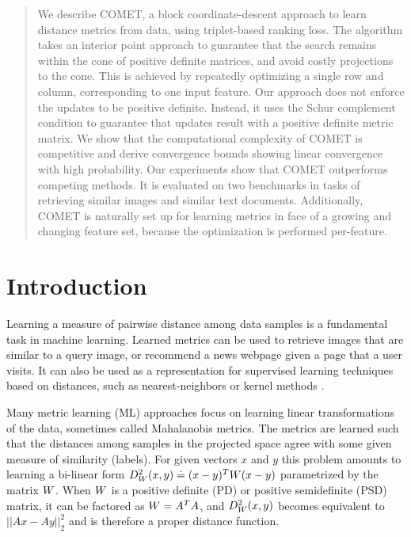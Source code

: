 \documentclass{article}
\begin{document}
\newtheorem{theorem}{Theorem}
\newtheorem{lemma}{Lemma}
\newtheorem{corollary}{Corollary}
\newtheorem{definition}{Definition}
\newtheorem{apptheorem}{Theorem}
\newtheorem{applemma}{Lemma}


\renewcommand{\eqref}[1]{Eq.~(\ref{#1})}
\newcommand{\figref}[1]{Fig.~\ref{#1}}
\newcommand{\secref}[1]{Sec.~\ref{#1}}
\newcommand{\tabref}[1]{Table~\ref{#1}}


\begin{abstract} 
We describe COMET, a block coordinate-descent approach to learn distance metrics from data, using triplet-based ranking loss. The algorithm takes an interior point approach to guarantee that the search remains within the cone of positive definite matrices, and avoid costly projections to the cone. This is achieved by repeatedly optimizing a single row and column, corresponding to one input feature. 
Our approach does not enforce the updates to be positive definite. Instead, it uses the Schur complement condition to guarantee that updates result with a positive definite metric matrix.
We show that the computational complexity of COMET is competitive and derive convergence bounds showing linear convergence with high probability. Our experiments show that COMET outperforms competing methods. It is evaluated on two benchmarks in tasks of retrieving similar images and similar text documents. Additionally,  COMET is naturally set up for learning metrics in face of a growing and changing feature set, because the optimization is performed per-feature.
\end{abstract} 

\section{Introduction}
Learning a measure of pairwise distance among data samples is a fundamental task in machine learning. Learned metrics can be used to retrieve images that are similar to a query image, or recommend a news webpage given a page that a user visits. It can also be used as a representation for supervised learning techniques based on distances, such as nearest-neighbors or kernel methods \cite{kulis2012survey}. 

Many metric learning (ML) approaches focus on learning linear transformations of the data, sometimes called Mahalanobis metrics. The metrics are learned such that the distances among samples in the projected space agree with some given measure of similarity (labels). For given vectors $x$ and $y$ this problem amounts to learning a bi-linear form  $D^2_{{W}}(x,y) \doteq (x-y)^T{W}(x-y)$ parametrized by the matrix ${W}$. When ${W}$ is a positive definite (PD) or positive semidefinite (PSD) matrix, it can be factored as ${W}=A^TA$,  and $D^2_{{W}}(x,y)$ becomes equivalent to $||Ax-Ay||^2_2$ and is therefore a proper distance function.
\end{document}
